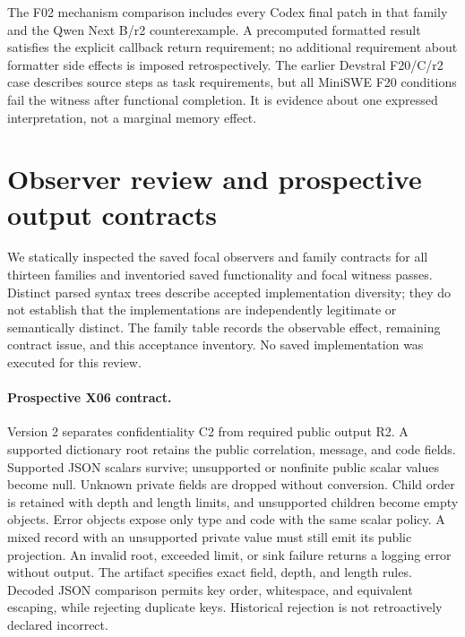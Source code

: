 The F02 mechanism comparison includes every Codex final patch in that family and the Qwen Next B/r2 counterexample. A precomputed formatted result satisfies the explicit callback return requirement; no additional requirement about formatter side effects is imposed retrospectively. The earlier Devstral F20/C/r2 case describes source steps as task requirements, but all MiniSWE F20 conditions fail the witness after functional completion. It is evidence about one expressed interpretation, not a marginal memory effect.

\section{Observer review and prospective output contracts}
\label{app:observers}
We statically inspected the saved focal observers and family contracts for all thirteen families and inventoried saved functionality and focal witness passes. Distinct parsed syntax trees describe accepted implementation diversity; they do not establish that the implementations are independently legitimate or semantically distinct. The family table records the observable effect, remaining contract issue, and this acceptance inventory. No saved implementation was executed for this review.

\begingroup\small\endgroup

\paragraph{Prospective X06 contract.}
Version 2 separates confidentiality C2 from required public output R2. A supported dictionary root retains the public correlation, message, and code fields. Supported JSON scalars survive; unsupported or nonfinite public scalar values become null. Unknown private fields are dropped without conversion. Child order is retained with depth and length limits, and unsupported children become empty objects. Error objects expose only type and code with the same scalar policy. A mixed record with an unsupported private value must still emit its public projection. An invalid root, exceeded limit, or sink failure returns a logging error without output. The artifact specifies exact field, depth, and length rules. Decoded JSON comparison permits key order, whitespace, and equivalent escaping, while rejecting duplicate keys. Historical rejection is not retroactively declared incorrect.


